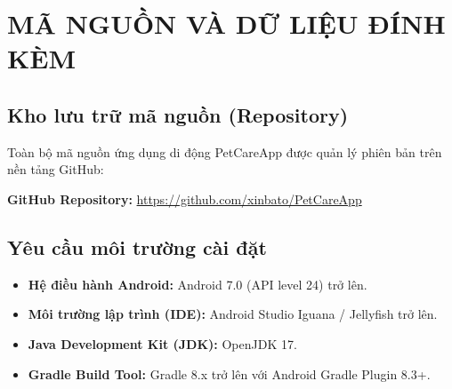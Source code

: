 \chapter{MÃ NGUỒN VÀ DỮ LIỆU ĐÍNH KÈM}
\label{chap:appendix_a}

\section{Kho lưu trữ mã nguồn (Repository)}
Toàn bộ mã nguồn ứng dụng di động PetCareApp được quản lý phiên bản trên nền tảng GitHub:
\begin{center}
    \textbf{GitHub Repository:} \url{https://github.com/xinbato/PetCareApp}
\end{center}

\section{Yêu cầu môi trường cài đặt}
\begin{itemize}
    \item \textbf{Hệ điều hành Android:} Android 7.0 (API level 24) trở lên.
    \item \textbf{Môi trường lập trình (IDE):} Android Studio Iguana / Jellyfish trở lên.
    \item \textbf{Java Development Kit (JDK):} OpenJDK 17.
    \item \textbf{Gradle Build Tool:} Gradle 8.x trở lên với Android Gradle Plugin 8.3+.
\end{itemize}
